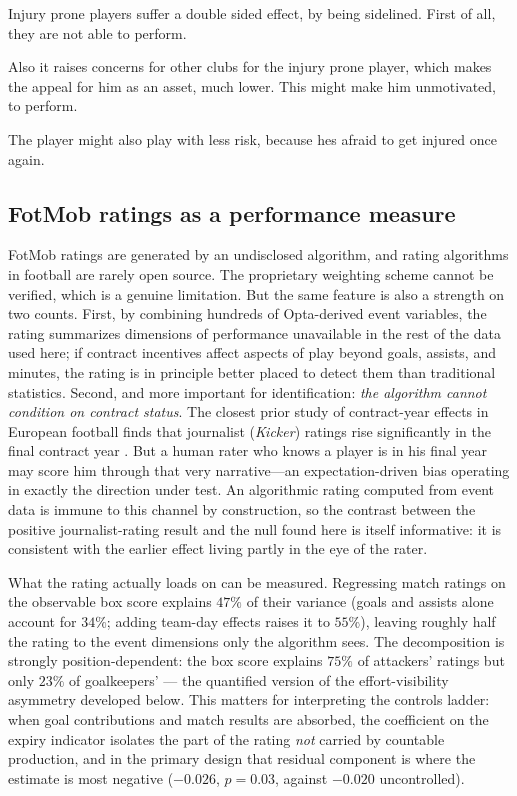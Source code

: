\documentclass{article}
\begin{document}
Injury prone players suffer a double sided effect, by being sidelined. First of all, they are not able to perform. 

Also it raises concerns for other clubs for the injury prone player, which makes the appeal for him as an asset, much lower. This might make him unmotivated, to perform. 

The player might also play with less risk, because hes afraid to get injured once again.


\subsection{FotMob ratings as a performance measure}

FotMob ratings are generated by an undisclosed algorithm, and rating
algorithms in football are rarely open source. The proprietary weighting
scheme cannot be verified, which is a genuine limitation. But the same
feature is also a strength on two counts. First, by combining hundreds of
Opta-derived event variables, the rating summarizes dimensions of performance
unavailable in the rest of the data used here; if contract incentives affect
aspects of play beyond goals, assists, and minutes, the rating is in principle
better placed to detect them than traditional statistics. Second, and more
important for identification: \emph{the algorithm cannot condition on contract
status}. The closest prior study of contract-year effects in European
football finds that journalist (\emph{Kicker}) ratings rise significantly in
the final contract year \citep{frick2011}. But a human rater who knows a
player is in his final year may score him through that very narrative---an
expectation-driven bias operating in exactly the direction under test. An
algorithmic rating computed from event data is immune to this channel by
construction, so the contrast between the positive journalist-rating result
and the null found here is itself informative: it is consistent with the
earlier effect living partly in the eye of the rater.

What the rating actually loads on can be measured. Regressing match ratings
on the observable box score explains $47\%$ of their variance (goals and
assists alone account for $34\%$; adding team-day effects raises it to
$55\%$), leaving roughly half the rating to the event dimensions only the
algorithm sees. The decomposition is strongly position-dependent: the box
score explains $75\%$ of attackers' ratings but only $23\%$ of
goalkeepers' --- the quantified version of the effort-visibility asymmetry
developed below. This matters for interpreting the controls ladder: when
goal contributions and match results are absorbed, the coefficient on the
expiry indicator isolates the part of the rating \emph{not} carried by
countable production, and in the primary design that residual component is
where the estimate is most negative ($-0.026$, $p=0.03$, against $-0.020$
uncontrolled).
\end{document}
